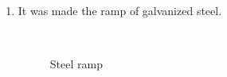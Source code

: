 \begin{enumerate}
\begin{enumerate}
		 \item It was made the ramp of galvanized steel.
		 		         \begin{figure}[H]
		 		         	\begin{minipage}[h]{0.2\linewidth}
		 		         		\center  
		 		         	\end{minipage}
		 		         	\begin{minipage}[h]{0.6\linewidth}
		 		         		\caption{Steel ramp}
		 		         	\end{minipage}
		 		         \end{figure}		 
		 

\end{enumerate}
\end{enumerate}
